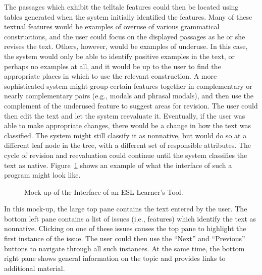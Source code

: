 \documentclass[main.tex]{subfiles}
\begin{document}
The passages which exhibit the telltale features could then be located using tables generated when the system initially identified the features. Many of these textual features would be examples of overuse of various grammatical constructions, and the user could focus on the displayed passages as he or she revises the text. Others, however, would be examples of underuse. In this case, the system would only be able to identify positive examples in the text, or perhaps no examples at all, and it would be up to the user to find the appropriate places in which to use the relevant construction. A more sophisticated system might group certain features together in complementary or nearly complementary pairs (e.g., modals and phrasal modals), and then use the complement of the underused feature to suggest areas for revision. The user could then edit the text and let the system reevaluate it. Eventually, if the user was able to make appropriate changes, there would be a change in how the text was classified. The system might still classify it as nonnative, but would do so at a different leaf node in the tree, with a different set of responsible attributes. The cycle of revision and reevaluation could continue until the system classifies the text as native. Figure~\ref{fig:mockup} shows an example of what the interface of such a program might look like.
\begin{figure}[htbp]
\centering
{}
\caption{Mock-up of the Interface of an ESL Learner's Tool.}
\label{fig:mockup}
\end{figure}
In this mock-up, the large top pane contains the text entered by the user. The bottom left pane contains a list of issues (i.e., features) which identify the text as nonnative. Clicking on one of these issues causes the top pane to highlight the first instance of the issue. The user could then use the ``Next'' and ``Previous'' buttons to navigate through all such instances. At the same time, the bottom right pane shows general information on the topic and provides links to additional material.
\end{document}
